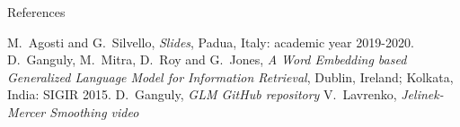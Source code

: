 \begin{frame}{References}
    \begin{thebibliography}{9}
        M.~Agosti and G.~Silvello,
        \emph{Slides}, Padua, Italy: academic year 2019-2020.
        D.~Ganguly, M.~Mitra, D.~Roy and G.~Jones,
        \emph{A Word Embedding based Generalized Language Model for Information Retrieval}, Dublin, Ireland; Kolkata, India: SIGIR 2015.
        D.~Ganguly,
        \emph{GLM GitHub repository}
        V.~Lavrenko,
        \emph{Jelinek-Mercer Smoothing video}
    \end{thebibliography}
\end{frame}
